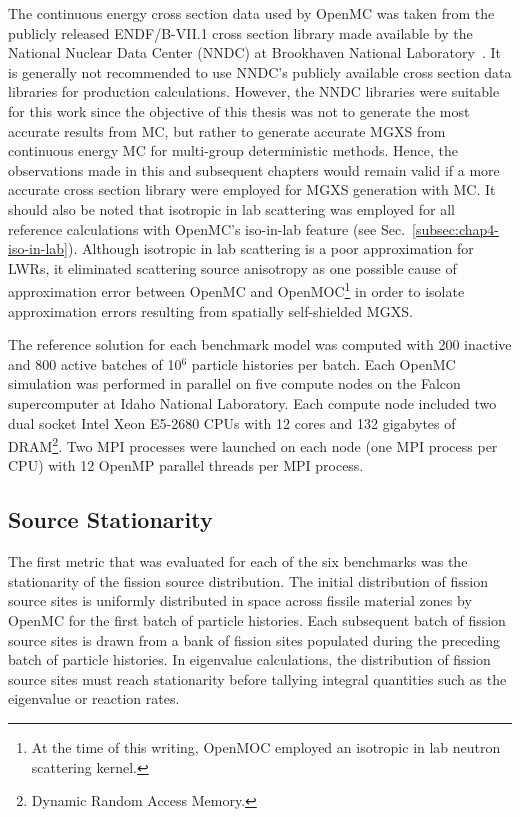 The continuous energy cross section data used by OpenMC was taken from the publicly released ENDF/B-VII.1 cross section library made available by the National Nuclear Data Center (NNDC) at Brookhaven National Laboratory~\cite{nndc2016endf}. It is generally not recommended to use NNDC's publicly available cross section data libraries for production calculations. However, the NNDC libraries were suitable for this work since the objective of this thesis was not to generate the most accurate results from \ac{MC}, but rather to generate accurate \ac{MGXS} from continuous energy \ac{MC} for multi-group deterministic methods. Hence, the observations made in this and subsequent chapters would remain valid if a more accurate cross section library were employed for \ac{MGXS} generation with \ac{MC}. It should also be noted that isotropic in lab scattering was employed for all reference calculations with OpenMC's iso-in-lab feature (see Sec.~\ref{subsec:chap4-iso-in-lab}). Although isotropic in lab scattering is a poor approximation for \acp{LWR}, it eliminated scattering source anisotropy as one possible cause of approximation error between OpenMC and OpenMOC\footnote{At the time of this writing, OpenMOC employed an isotropic in lab neutron scattering kernel.} in order to isolate approximation errors resulting from spatially self-shielded \ac{MGXS}.

The reference solution for each benchmark model was computed with 200 inactive and 800 active batches of 10$^6$ particle histories per batch. Each OpenMC simulation was performed in parallel on five compute nodes on the Falcon supercomputer at Idaho National Laboratory. Each compute node included two dual socket Intel Xeon E5-2680 CPUs with 12 cores and 132 gigabytes of DRAM\footnote{Dynamic Random Access Memory.}. Two MPI processes were launched on each node (one MPI process per CPU) with 12 OpenMP parallel threads per MPI process.

\subsection{Source Stationarity}
\label{subsec:chap7-src-stationarity}

The first metric that was evaluated for each of the six benchmarks was the stationarity of the fission source distribution. The initial distribution of fission source sites is uniformly distributed in space across fissile material zones by OpenMC for the first batch of particle histories. Each subsequent batch of fission source sites is drawn from a bank of fission sites populated during the preceding batch of particle histories. In eigenvalue calculations, the distribution of fission source sites must reach stationarity before tallying integral quantities such as the eigenvalue or reaction rates. 

